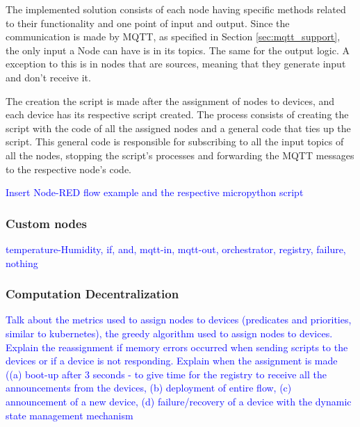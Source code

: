 The implemented solution consists of each node having specific methods related to their functionality and one point of input and output. Since the communication is made by MQTT, as specified in Section \ref{sec:mqtt_support}, the only input a Node can have is in its topics. The same for the output logic. A exception to this is in nodes that are sources, meaning that they generate input and don't receive it. 

The creation the script is made after the assignment of nodes to devices, and each device has its respective script created. The process consists of creating the script with the code of all the assigned nodes and a general code that ties up the script. This general code is responsible for subscribing to all the input topics of all the nodes, stopping the script's processes and forwarding the MQTT messages to the respective node's code.

\textcolor{blue}{Insert Node-RED flow example and the respective micropython script}

\subsubsection{Custom nodes}\label{sec:custom_nodes}

\textcolor{blue}{temperature-Humidity, if, and, mqtt-in, mqtt-out, orchestrator, registry, failure, nothing}

\subsubsection{Computation Decentralization}\label{sec:node_red_computation_decentralization}

\textcolor{blue}{Talk about the metrics used to assign nodes to devices (predicates and priorities, similar to kubernetes),  the greedy algorithm used to assign nodes to devices. Explain the reassignment if memory errors occurred when sending scripts to the devices or if a device is not responding. Explain when the assignment is made ((a) boot-up after 3 seconds - to give time for the registry to receive all the announcements from the devices, (b) deployment of entire flow, (c) announcement of a new device, (d) failure/recovery of a device with the dynamic state management mechanism}


    
